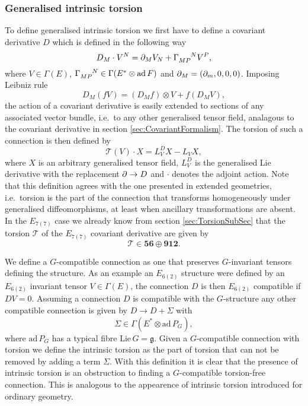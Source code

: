 \subsubsection{Generalised intrinsic torsion}
To define generalised intrinsic torsion we first have to define a covariant derivative $D$ which is defined in the following way 
\begin{equation}
    D_M\cdot V^N = \pd_MV_N+\tensor{\Gamma}{_M_P^N}V^P,
\end{equation}
where $V\in\Gamma(E)$, $\tensor{\Gamma}{_{MP}^N}\in\Gamma(E^*\otimes \text{ad}\,F)$ and $\partial_M=(\partial_m,0,0,0)$. Imposing Leibniz rule 
\begin{equation}
    D_M(fV) = (D_Mf)\otimes V+f(D_MV),
\end{equation}
the action of a covariant derivative is easily extended to sections of any associated vector bundle, i.e.\ to any other generalised tensor field, analagous to the covariant derivative in section \ref{sec:CovariantFormalism}. The torsion of such a connection is then defined by 
\begin{equation}
    \mathscr{T}(V)\cdot X = L_V^D X-L_V X,
\end{equation}
where $X$ is an arbitrary generalised tensor field, $L_V^D$ is the generalised Lie derivative with the replacement $\partial\to D$ and $\cdot$ denotes the adjoint action. Note that this definition agrees with the one presented in extended geometries, i.e.\ torsion is the part of the connection that transforms homogeneously under generalised diffeomorphisms, at least when ancillary transformations are absent. In the $E_{7(7)}$ case we already know from section \ref{sec:TorsionSubSec} that the torsion $\mathscr{T}$ of the $E_{7(7)}$ covariant derivative are given by
\begin{equation}
    \mathscr{T}\in \mathbf{56}\oplus\mathbf{912}.
\end{equation}

We define a $G$-compatible connection as one that preserves $G$-invariant tensors defining the structure. As an example an $E_{6(2)}$ structure were defined by an $E_{6(2)}$ invariant tensor $V\in\Gamma(E)$, the connection $D$ is then $E_{6(2)}$ compatible if $DV=0$. Assuming a connection $D$ is compatible with the $G$-structure any other compatible connection is given by $D\to D+\Sigma$ with 
\begin{equation}
    \Sigma \in \Gamma(E^*\otimes \text{ad}\,P_G),
\end{equation}
where $\text{ad}\,P_G$ has a typical fibre $\text{Lie}\,G=\mathfrak{g}$. Given a $G$-compatible connection with torsion we define the intrinsic torsion as the part of torsion that can not be removed by adding a term $\Sigma$. With this definition it is clear that the presence of intrinsic torsion is an obstruction to finding a $G$-compatible torsion-free connection. This is analogous to the appearence of intrinsic torsion introduced for ordinary geometry. 

